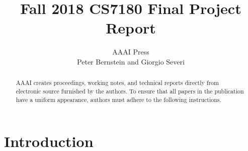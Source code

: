 \documentclass[letterpaper]{article} %
\begin{document}
%
\title{Fall 2018 CS7180 Final Project Report}
\author{AAAI Press\\
Peter Bernstein and Giorgio Severi
}
\maketitle
\begin{abstract}
AAAI creates proceedings, working notes, and technical reports directly from electronic source furnished by the authors. To ensure that all papers in the publication have a uniform appearance, authors must adhere to the following instructions. 
\end{abstract}

\section{Introduction}
 

\end{document}

